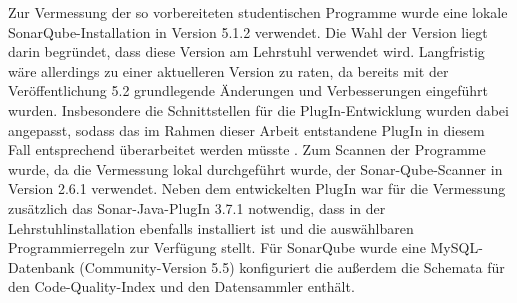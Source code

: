 \documentclass[da,ngerman]{stthesis}
\begin{document}
  			Zur Vermessung der so vorbereiteten studentischen Programme wurde eine lokale SonarQube-Installation in Version 5.1.2 verwendet. Die Wahl der Version liegt darin begründet, dass diese Version am Lehrstuhl verwendet wird. Langfristig wäre allerdings zu einer aktuelleren Version zu raten, da bereits mit der Veröffentlichung 5.2 grundlegende Änderungen und Verbesserungen eingeführt wurden. Insbesondere die Schnittstellen für die PlugIn-Entwicklung wurden dabei angepasst, sodass das im Rahmen dieser Arbeit entstandene PlugIn in diesem Fall entsprechend überarbeitet werden müsste \cite{APIChanges}. \newline
  			Zum Scannen der Programme wurde, da die Vermessung lokal durchgeführt wurde, der Sonar-Qube-Scanner in Version 2.6.1 verwendet. Neben dem entwickelten PlugIn war für die Vermessung zusätzlich das Sonar-Java-PlugIn 3.7.1 notwendig, dass in der Lehrstuhlinstallation ebenfalls installiert ist und die auswählbaren Programmierregeln zur Verfügung stellt. Für SonarQube wurde eine MySQL-Datenbank (Community-Version 5.5) konfiguriert die außerdem die Schemata für den Code-Quality-Index und den Datensammler enthält. \newline
\end{document}

